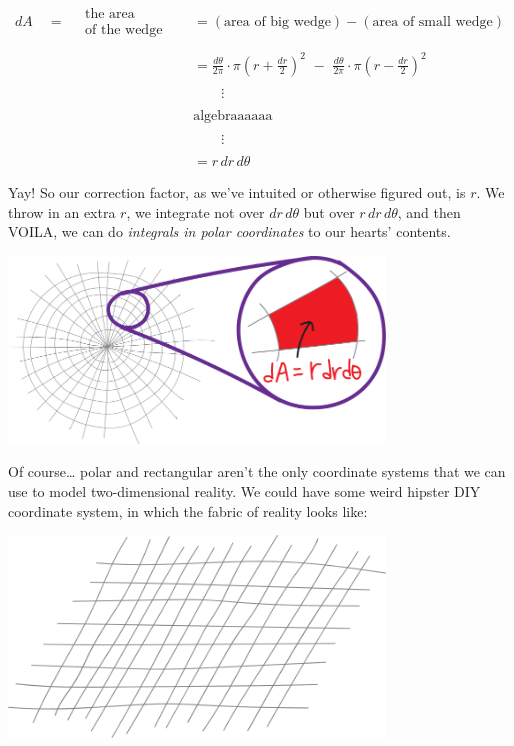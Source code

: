 \documentclass[
]{article}
\begin{document}
\begin{align*}
dA \quad=\quad \substack{\text{the area}\\\text{of the wedge}} \quad&= (\text{area of big wedge}) - (\text{area of small wedge}) \\ \\
&= \frac{d\theta}{2\pi}\cdot \pi\left(r+\frac{dr}{2}\right)^2 \,\,-\,\, \frac{d\theta}{2\pi}\cdot\pi\left(r-\frac{dr}{2}\right)^2 \\ \\
&\quad\quad\vdots \\ \\
&\text{algebraaaaaa} \\ \\
&\quad\quad\vdots \\ \\
&= r\, dr \, d\theta
\end{align*}

Yay! So our correction factor, as we've intuited or otherwise figured out, is \(r\). We throw in an extra \(r\), we integrate not over \(dr\,d\theta\) but over \(r\, dr\, d\theta\), and then VOILA, we can do \emph{integrals in polar coordinates} to our hearts' contents.

\includegraphics[width=0.75\textwidth,height=\textheight]{polar-world-4.svg}

Of course\ldots{} polar and rectangular aren't the only coordinate systems that we can use to model two-dimensional reality. We could have some weird hipster DIY coordinate system, in which the fabric of reality looks like:

\includegraphics[width=0.75\textwidth,height=\textheight]{skewed-rectangular-world.svg}
\end{document}
